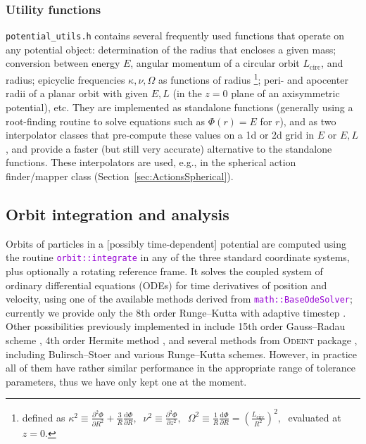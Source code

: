 \documentclass[12pt]{article}
\newcommand{\ttt}[1]{\textcolor{darkviolet}{\texttt{#1}}}
\renewcommand{\d}{\mathrm{d}}
\newcommand{\D}{\partial}
\begin{document}
\subsubsection{Utility functions}  \label{sec:PotentialUtility}

\texttt{potential_utils.h} contains several frequently used functions that operate on any potential object: determination of the radius that encloses a given mass; conversion between energy $E$, angular momentum of a circular orbit $L_\mathrm{circ}$, and radius; epicyclic frequencies $\kappa,\nu,\Omega$ as functions of radius%
\footnote{defined as $\displaystyle \kappa^2\equiv \frac{\D ^2\Phi}{\D R^2} + \frac 3 R \frac{\d\Phi}{\D R},\;\; \nu^2\equiv \frac{\D ^2\Phi}{\D z^2},\;\; \Omega^2\equiv \frac 1 R \frac{\d\Phi}{\D R} = \left(\frac{L_\mathrm{circ}}{R^2}\right)^2,\;$ evaluated at $z=0$.};
peri- and apocenter radii of a planar orbit with given $E,L$ (in the $z=0$ plane of an axisymmetric potential), etc. They are implemented as standalone functions (generally using a root-finding routine to solve equations such as $\Phi(r)=E$ for $r$), and as two interpolator classes that pre-compute these values on a 1d or 2d grid in $E$ or $E,L$, and provide a faster (but still very accurate) alternative to the standalone functions. These interpolators are used, e.g., in the spherical action finder/mapper class (Section~\ref{sec:ActionsSpherical}).


\subsection{Orbit integration and analysis}  \label{sec:Orbits}

Orbits of particles in a [possibly time-dependent] potential are computed using the routine \ttt{orbit::integrate} in any of the three standard coordinate systems, plus optionally a rotating reference frame. It solves the coupled system of ordinary differential equations (ODEs) for time derivatives of position and velocity, using one of the available methods derived from \ttt{math::BaseOdeSolver}; currently we provide only the 8th order Runge--Kutta with adaptive timestep \cite{DOP853}. Other possibilities previously implemented in \cite{Vasiliev2013} include 15th order Gauss--Radau scheme \cite{IAS15}, 4th order Hermite method \cite{Hermite}, and several methods from \textsc{Odeint} package \cite{odeint}, including Bulirsch--Stoer and various Runge--Kutta schemes. However, in practice all of them have rather similar performance in the appropriate range of tolerance parameters, thus we have only kept one at the moment.
\end{document}
